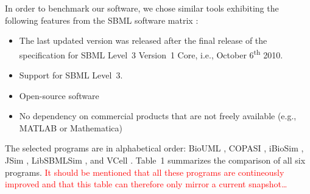 \documentclass[10pt]{bmc_article}
\newenvironment{bmcformat}{\fussy\setboolean{publ}{true}}{\fussy}
\newcommand{\TODO}[1]{\textcolor{red}{#1}}
\begin{document}
\begin{bmcformat}
In order to benchmark our software, we chose similar tools exhibiting the
following features from the \acs{SBML} software
matrix \TODO{\cite{SBMLsoftwareMatrix2012}}:
%
%
\begin{itemize}
  \item The last updated version was released after the final release of
  the specification for \acs{SBML} Level~3 Version~1 Core, i.e., October
  6\textsuperscript{th} 2010.
  \item Support for \acs{SBML} Level~3.
  \item Open-source software
  \item No dependency on commercial products that are not freely available
  (e.g., MATLAB\texttrademark{} or Mathematica\texttrademark)
\end{itemize}
The selected programs are in alphabetical order:
BioUML \cite{Kolpakov2011, Kolpakov2006}, COPASI \cite{Hoops2006}, 
iBioSim \cite{Myers2009}, JSim \cite{Raymond2003}, LibSBMLSim 
\cite{Funahashi2012}, and VCell \cite{Moraru2008}.
Table~1 summarizes the comparison of all six programs.
\TODO{It should be mentioned that all these programs are contineously improved and that this table can therefore only mirror a current snapshot\ldots}


\end{bmcformat}
\end{document}

